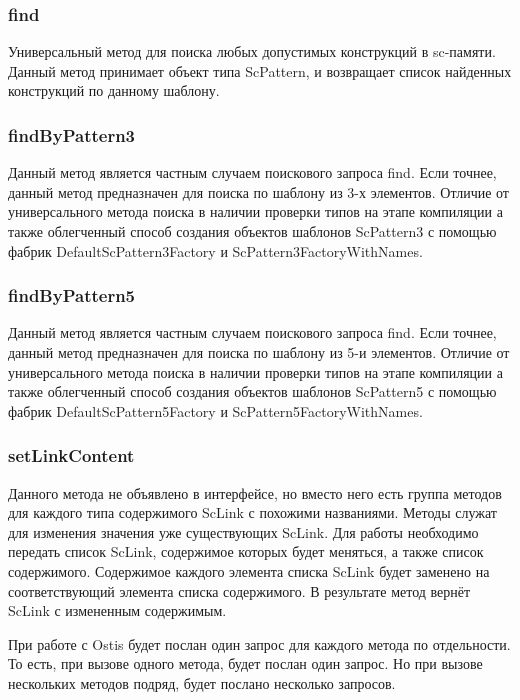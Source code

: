 \subsubsection{find}

Универсальный метод для поиска любых допустимых конструкций в sc-памяти. Данный метод принимает объект типа ScPattern, и возвращает список найденных конструкций по данному шаблону. 

\subsubsection{findByPattern3}

Данный метод является частным случаем поискового запроса find. Если точнее, данный метод предназначен для поиска по шаблону из 3-х элементов. Отличие от универсального метода поиска в наличии проверки типов на этапе компиляции а также облегченный способ создания объектов шаблонов ScPattern3 с помощью фабрик DefaultScPattern3Factory и ScPattern3FactoryWithNames. 

\subsubsection{findByPattern5}

Данный метод является частным случаем поискового запроса find. Если точнее, данный метод предназначен для поиска по шаблону из 5-и элементов. Отличие от универсального метода поиска в наличии проверки типов на этапе компиляции а также облегченный способ создания объектов шаблонов ScPattern5 с помощью фабрик DefaultScPattern5Factory и ScPattern5FactoryWithNames. 

\subsubsection{setLinkContent}
Данного метода не объявлено в интерфейсе, но вместо него есть группа методов для каждого типа содержимого ScLink с похожими названиями. Методы служат для изменения значения уже существующих ScLink. Для работы необходимо передать список ScLink, содержимое которых будет меняться, а также список содержимого. Содержимое каждого элемента списка ScLink будет заменено на соответствующий элемента списка содержимого. В результате метод вернёт ScLink с измененным содержимым. 

При работе с Ostis будет послан один запрос для каждого метода по отдельности. То есть, при вызове одного метода, будет послан один запрос. Но при вызове нескольких методов подряд, будет послано несколько запросов.

